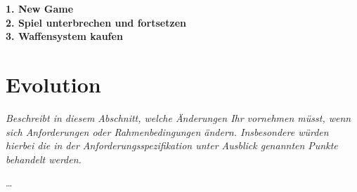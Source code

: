 \documentclass[fontsize=12pt,paper=a4,twoside]{scrartcl}
\begin{document}
\textbf{1. New Game}\\
\textbf{2. Spiel unterbrechen und fortsetzen}\\
\textbf{3. Waffensystem kaufen}
\section{Evolution} \label{sec:evolution}

{\itshape Beschreibt in diesem Abschnitt, welche Änderungen Ihr vornehmen müsst,
wenn sich Anforderungen oder Rahmenbedingungen ändern. Insbesondere würden 
hierbei die in der Anforderungsspezifikation unter \glqq{}Ausblick\grqq{} 
genannten Punkte behandelt werden.}

\dots
\end{document}
